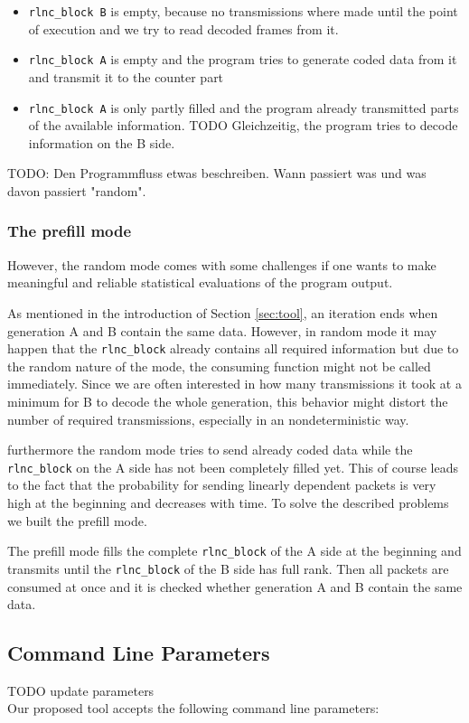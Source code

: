 \documentclass[a4paper,english,10pt]{tumarticle}
\begin{document}
\begin{itemize}
  \item \texttt{rlnc\_block B} is empty, because no transmissions where made until the point of execution and we try to read decoded frames from it.
  \item \texttt{rlnc\_block A} is empty and the program tries to generate coded data from it and transmit it to the counter part
  \item \texttt{rlnc\_block A} is only partly filled and the program already transmitted parts of the available information. TODO Gleichzeitig, 
  the program tries to decode information on the B side.
\end{itemize}

TODO: Den Programmfluss etwas beschreiben. Wann passiert was und was davon passiert "random".

\subsubsection{The prefill mode}\label{sec:prefill}
However, the random mode comes with some challenges if one wants to make meaningful and reliable statistical 
evaluations of the program output.

As mentioned in the introduction of Section \ref{sec:tool}, an iteration ends when generation A and B contain the same data. 
However, in random mode it may happen that the \texttt{rlnc\_block} already contains all required information but due
to the random nature of the mode, the consuming function might not be called immediately.
Since we are often interested in how many transmissions it took at a minimum for B to decode the whole generation, this behavior 
might distort the number of required transmissions, especially in an nondeterministic way.

furthermore the random mode tries to send already coded data while the \texttt{rlnc\_block} on the A side has not been completely filled yet. 
This of course leads to the fact that the probability for sending linearly dependent packets is very high at the beginning and 
decreases with time. 
To solve the described problems we built the prefill mode.

The prefill mode fills the complete \texttt{rlnc\_block} of the A side at the beginning and transmits until the 
\texttt{rlnc\_block} of the B side has full rank. Then all packets are consumed at once and it is checked 
whether generation A and B contain the same data.

\subsection{Command Line Parameters}\label{app:cmd}
TODO update parameters\\
Our proposed tool accepts the following command line parameters:
\end{document}

